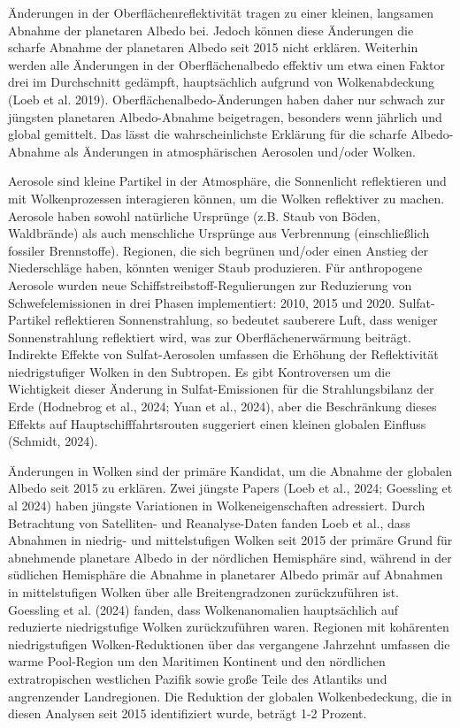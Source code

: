 \documentclass[12pt,paper=a4,DIV=12,parskip=never,chapterprefix=false,headings=standardclasses]{scrreprt}
\begin{document}
Änderungen in der Oberflächenreflektivität tragen zu einer kleinen, langsamen Abnahme der planetaren Albedo bei. Jedoch können diese Änderungen die scharfe Abnahme der planetaren Albedo seit 2015 nicht erklären. Weiterhin werden alle Änderungen in der Oberflächenalbedo effektiv um etwa einen Faktor drei im Durchschnitt gedämpft, hauptsächlich aufgrund von Wolkenabdeckung (Loeb et al. 2019). Oberflächenalbedo-Änderungen haben daher nur schwach zur jüngsten planetaren Albedo-Abnahme beigetragen, besonders wenn jährlich und global gemittelt. Das lässt die wahrscheinlichste Erklärung für die scharfe Albedo-Abnahme als Änderungen in atmosphärischen Aerosolen und/oder Wolken.

Aerosole sind kleine Partikel in der Atmosphäre, die Sonnenlicht reflektieren und mit Wolkenprozessen interagieren können, um die Wolken reflektiver zu machen. Aerosole haben sowohl natürliche Ursprünge (z.B. Staub von Böden, Waldbrände) als auch menschliche Ursprünge aus Verbrennung (einschließlich fossiler Brennstoffe). Regionen, die sich begrünen und/oder einen Anstieg der Niederschläge haben, könnten weniger Staub produzieren. Für anthropogene Aerosole wurden neue Schiffstreibstoff-Regulierungen zur Reduzierung von Schwefelemissionen in drei Phasen implementiert: 2010, 2015 und 2020. Sulfat-Partikel reflektieren Sonnenstrahlung, so bedeutet sauberere Luft, dass weniger Sonnenstrahlung reflektiert wird, was zur Oberflächenerwärmung beiträgt. Indirekte Effekte von Sulfat-Aerosolen umfassen die Erhöhung der Reflektivität niedrigstufiger Wolken in den Subtropen. Es gibt Kontroversen um die Wichtigkeit dieser Änderung in Sulfat-Emissionen für die Strahlungsbilanz der Erde (Hodnebrog et al., 2024; Yuan et al., 2024), aber die Beschränkung dieses Effekts auf Hauptschifffahrtsrouten suggeriert einen kleinen globalen Einfluss (Schmidt, 2024).

Änderungen in Wolken sind der primäre Kandidat, um die Abnahme der globalen Albedo seit 2015 zu erklären. Zwei jüngste Papers (Loeb et al., 2024; Goessling et al 2024) haben jüngste Variationen in Wolkeneigenschaften adressiert. Durch Betrachtung von Satelliten- und Reanalyse-Daten fanden Loeb et al., dass Abnahmen in niedrig- und mittelstufigen Wolken seit 2015 der primäre Grund für abnehmende planetare Albedo in der nördlichen Hemisphäre sind, während in der südlichen Hemisphäre die Abnahme in planetarer Albedo primär auf Abnahmen in mittelstufigen Wolken über alle Breitengradzonen zurückzuführen ist. Goessling et al. (2024) fanden, dass Wolkenanomalien hauptsächlich auf reduzierte niedrigstufige Wolken zurückzuführen waren. Regionen mit kohärenten niedrigstufigen Wolken-Reduktionen über das vergangene Jahrzehnt umfassen die warme Pool-Region um den Maritimen Kontinent und den nördlichen extratropischen westlichen Pazifik sowie große Teile des Atlantiks und angrenzender Landregionen. Die Reduktion der globalen Wolkenbedeckung, die in diesen Analysen seit 2015 identifiziert wurde, beträgt 1-2 Prozent.
\end{document}
